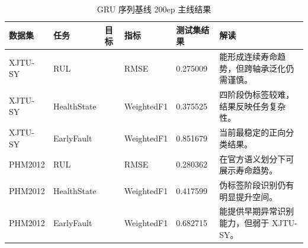 \begin{table}[H]
\centering
\caption{GRU 序列基线 200ep 主线结果}
\label{tab:gru-results}
\small
\begin{tabularx}{\textwidth}{p{2.5cm}p{3.0cm}p{2.8cm}p{2.2cm}p{2.0cm}Y}
\toprule
数据集 & 任务 & 目标 & 指标 & 测试集结果 & 解读 \\
\midrule
XJTU-SY & RUL &  & RMSE & 0.275009 & 能形成连续寿命趋势，但跨轴承泛化仍需谨慎。 \\
XJTU-SY & HealthState &  & WeightedF1 & 0.375525 & 四阶段伪标签较难，结果反映任务复杂性。 \\
XJTU-SY & EarlyFault &  & WeightedF1 & 0.851679 & 当前最稳定的正向分类结果。 \\
PHM2012 & RUL &  & RMSE & 0.280362 & 在官方语义划分下可展示寿命趋势。 \\
PHM2012 & HealthState &  & WeightedF1 & 0.417599 & 伪标签阶段识别仍有明显提升空间。 \\
PHM2012 & EarlyFault &  & WeightedF1 & 0.682715 & 能提供早期异常识别能力，但弱于 XJTU-SY。 \\
\bottomrule
\end{tabularx}
\end{table}
